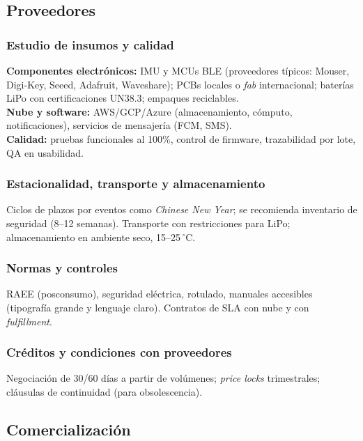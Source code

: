 \subsection{Proveedores}

\subsubsection{Estudio de insumos y calidad}
\textbf{Componentes electrónicos:} IMU y MCUs BLE (proveedores típicos: Mouser, Digi-Key, Seeed, Adafruit, Waveshare); PCBs locales o \emph{fab} internacional; baterías LiPo con certificaciones UN38.3; empaques reciclables.\\
\textbf{Nube y software:} AWS/GCP/Azure (almacenamiento, cómputo, notificaciones), servicios de mensajería (FCM, SMS).\\
\textbf{Calidad:} pruebas funcionales al 100\%, control de firmware, trazabilidad por lote, QA en usabilidad.

\subsubsection{Estacionalidad, transporte y almacenamiento}
Ciclos de plazos por eventos como \emph{Chinese New Year}; se recomienda inventario de seguridad (8--12 semanas). Transporte con restricciones para LiPo; almacenamiento en ambiente seco, 15--25\,$^\circ$C.

\subsubsection{Normas y controles}
RAEE (posconsumo), seguridad eléctrica, rotulado, manuales accesibles (tipografía grande y lenguaje claro). Contratos de SLA con nube y con \emph{fulfillment}.

\subsubsection{Créditos y condiciones con proveedores}
Negociación de 30/60 días a partir de volúmenes; \emph{price locks} trimestrales; cláusulas de continuidad (para obsolescencia).

\subsection{Comercialización}


